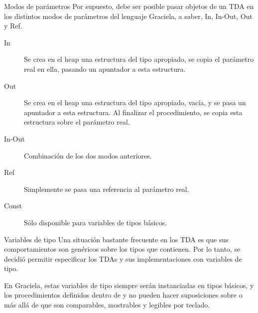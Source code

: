 \begin{frame}{Modos de parámetros}
Por supuesto, debe ser posible pasar objetos de un TDA en los distintos modos de parámetros del lenguaje Graciela, a saber, In, In-Out, Out y Ref.

\begin{description}
  \item [In]     Se crea en el heap una estructura del tipo apropiado, se copia el parámetro real en ella, pasando un apuntador a esta estructura.
  \item [Out]    Se crea en el heap una estructura del tipo apropiado, vacía, y se pasa un apuntador a esta estructura. Al finalizar el procedimiento, se copia esta estructura sobre el parámetro real.
  \item [In-Out] Combinación de los dos modos anteriores. 
  \item [Ref]    Simplemente se pasa una referencia al parámetro real.
  \item [Const]  Sólo disponible para variables de tipos básicos. 
\end{description}

\end{frame}


\begin{frame}{Variables de tipo}
Una situación bastante frecuente en los TDA es que sus comportamientos son genéricos sobre los tipos que contienen. Por lo tanto, se decidió permitir
especificar los TDAs y sus implementaciones con variables de tipo. 

\typevar

En Graciela, estas variables de tipo siempre serán instanciadas en tipos básicos, y los procedimientos definidos dentro de  y  no pueden hacer suposiciones sobre  o  más allá de que son comparables, mostrables y legibles por teclado. 
\end{frame}


